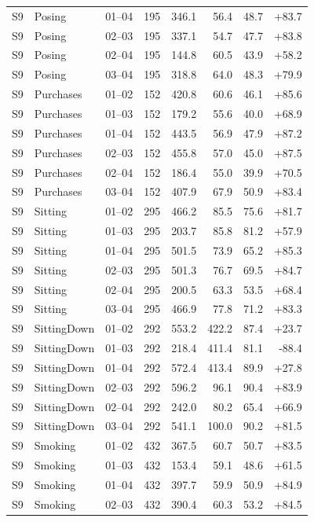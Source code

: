 \begin{center}
{\begin{longtable}{llrrrrrr}
S9 & Posing & 01--04 & 195 & 346.1 & 56.4 & 48.7 & +83.7 \\
S9 & Posing & 02--03 & 195 & 337.1 & 54.7 & 47.7 & +83.8 \\
S9 & Posing & 02--04 & 195 & 144.8 & 60.5 & 43.9 & +58.2 \\
S9 & Posing & 03--04 & 195 & 318.8 & 64.0 & 48.3 & +79.9 \\
S9 & Purchases & 01--02 & 152 & 420.8 & 60.6 & 46.1 & +85.6 \\
S9 & Purchases & 01--03 & 152 & 179.2 & 55.6 & 40.0 & +68.9 \\
S9 & Purchases & 01--04 & 152 & 443.5 & 56.9 & 47.9 & +87.2 \\
S9 & Purchases & 02--03 & 152 & 455.8 & 57.0 & 45.0 & +87.5 \\
S9 & Purchases & 02--04 & 152 & 186.4 & 55.0 & 39.9 & +70.5 \\
S9 & Purchases & 03--04 & 152 & 407.9 & 67.9 & 50.9 & +83.4 \\
S9 & Sitting & 01--02 & 295 & 466.2 & 85.5 & 75.6 & +81.7 \\
S9 & Sitting & 01--03 & 295 & 203.7 & 85.8 & 81.2 & +57.9 \\
S9 & Sitting & 01--04 & 295 & 501.5 & 73.9 & 65.2 & +85.3 \\
S9 & Sitting & 02--03 & 295 & 501.3 & 76.7 & 69.5 & +84.7 \\
S9 & Sitting & 02--04 & 295 & 200.5 & 63.3 & 53.5 & +68.4 \\
S9 & Sitting & 03--04 & 295 & 466.9 & 77.8 & 71.2 & +83.3 \\
S9 & SittingDown & 01--02 & 292 & 553.2 & 422.2 & 87.4 & +23.7 \\
S9 & SittingDown & 01--03 & 292 & 218.4 & 411.4 & 81.1 & -88.4 \\
S9 & SittingDown & 01--04 & 292 & 572.4 & 413.4 & 89.9 & +27.8 \\
S9 & SittingDown & 02--03 & 292 & 596.2 & 96.1 & 90.4 & +83.9 \\
S9 & SittingDown & 02--04 & 292 & 242.0 & 80.2 & 65.4 & +66.9 \\
S9 & SittingDown & 03--04 & 292 & 541.1 & 100.0 & 90.2 & +81.5 \\
S9 & Smoking & 01--02 & 432 & 367.5 & 60.7 & 50.7 & +83.5 \\
S9 & Smoking & 01--03 & 432 & 153.4 & 59.1 & 48.6 & +61.5 \\
S9 & Smoking & 01--04 & 432 & 397.7 & 59.9 & 50.9 & +84.9 \\
S9 & Smoking & 02--03 & 432 & 390.4 & 60.3 & 53.2 & +84.5 \\

\end{longtable}}
\end{center}
